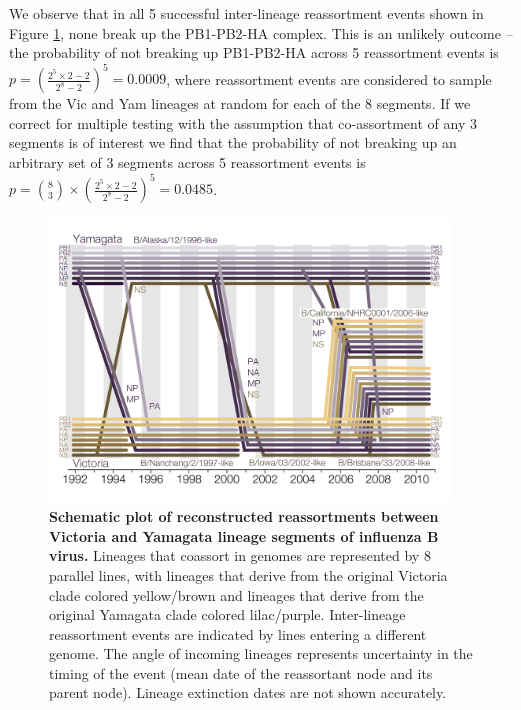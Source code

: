 \documentclass[11pt,oneside,letterpaper]{article}
\begin{document}
We observe that in all 5 successful inter-lineage reassortment events shown in Figure \ref{railroadPlot}, none break up the PB1-PB2-HA complex.
This is an unlikely outcome -- the probability of not breaking up PB1-PB2-HA across 5 reassortment events is $p = (\frac{2^{5} \times 2 - 2}{2^{8} - 2})^{5} = 0.0009$, where reassortment events are considered to sample from the Vic and Yam lineages at random for each of the 8 segments.
If we correct for multiple testing with the assumption that co-assortment of any 3 segments is of interest we find that the probability of not breaking up an arbitrary set of 3 segments across 5 reassortment events is $p = \binom{8}{3} \times (\frac{2^{5} \times 2 - 2}{2^{8} - 2})^{5} = 0.0485$.

\begin{figure}[h]
	\centering		
	\includegraphics[width=0.95\textwidth]{figures/RailroadPlotDated.pdf}
	\caption{\textbf{Schematic plot of reconstructed reassortments between Victoria and Yamagata lineage segments of influenza B virus.}
Lineages that coassort in genomes are represented by 8 parallel lines, with lineages that derive from the original Victoria clade colored yellow/brown and lineages that derive from the original Yamagata clade colored lilac/purple.
Inter-lineage reassortment events are indicated by lines entering a different genome.
The angle of incoming lineages represents uncertainty in the timing of the event (mean date of the reassortant node and its parent node).
Lineage extinction dates are not shown accurately.}
	\label{railroadPlot}
\end{figure}
\end{document}
